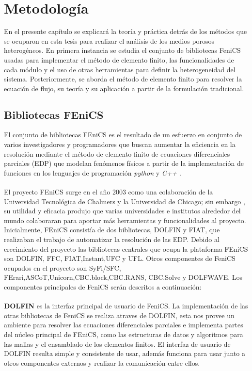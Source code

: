\chapter{Metodología}
En el presente capítulo se explicará la teoría y práctica detrás de los métodos que se ocuparon en esta tesis para realizar el análisis de los medios porosos heterogéneos. En primera instancia se estudia el conjunto de bibliotecas FeniCS usadas para implementar el método de elemento finito, las funcionalidades de cada módulo y el uso de otras herramientas para definir la heterogeneidad del sistema. Posteriormente, se aborda el método de elemento finito para resolver la ecuación de flujo, su teoría y su aplicación a partir de la formulación tradicional.




\section{Bibliotecas FEniCS}

El conjunto de bibliotecas FEniCS es el resultado de un esfuerzo en conjunto de varios investigadores y programadores que buscan aumentar la eficiencia en la resolución mediante el método de elemento finito de ecuaciones diferenciales parciales (EDP) que modelan fenómenos físicos a partir de la implementación de funciones en los lenguajes de programación \textit{python} y \textit{C++} \cite{Logg2012}.
\\
\\
El proyecto FEniCS surge en el año 2003 como una colaboración de la Universidad Tecnológica de Chalmers y la Universidad de Chicago; sin embargo , su utilidad y eficacia produjo que varias universidades e institutos alrededor del mundo colaboraran para aportar más herramientas y funcionalidades al proyecto. Inicialmente, FEniCS consistía de dos bibliotecas, DOLFIN y FIAT, que realizaban el trabajo de automatizar la resolución de las EDP. Debido al crecimiento del proyecto las bibliotecas centrales que ocupa la plataforma FEniCS son DOLFIN, FFC, FIAT,Instant,UFC y UFL. Otros componentes de FeniCS ocupados en el proyecto son SyFi/SFC, FErari,ASCoT,Unicorn,CBC.block,CBC.RANS, CBC.Solve y DOLFWAVE. Los componentes principales de FeniCS serán descritos a continuación:
\\
\\
\textbf{DOLFIN} es la interfaz principal de usuario de FeniCS. La implementación de las otras bibliotecas de FeniCS se realiza atraves de DOLFIN, esta nos provee un ambiente para resolver las ecuaciones diferenciales parciales e implementa partes del núcleo principal de FEniCS, como las estructuras de datos y algoritmos para las mallas y el ensamblado de los elementos finitos. El interfaz de usuario de DOLFIN resulta simple y consistente de usar, además funciona para usar junto a otros componentes externos y realizar la comunicación entre ellos.


